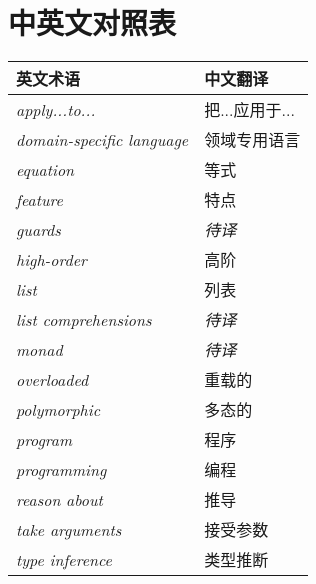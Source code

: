 \chapter*{中英文对照表}

\begin{table}[htbp]
\label{tab:threesome}
\centering
\begin{tabular}{ll}
\hline
英文术语 & 中文翻译 \\
\hline
\textit{apply...to...} & 把...应用于...\\
\textit{domain-specific language} & 领域专用语言 \\
\textit{equation} & 等式\\
\textit{feature} & 特点 \\
\textit{guards} & \textit{待译} \\
\textit{high-order} & 高阶 \\
\textit{list} & 列表 \\
\textit{list comprehensions} & \textit{待译}\\
\textit{monad} & \textit{待译} \\
\textit{overloaded} & 重载的 \\
\textit{polymorphic} & 多态的 \\
\textit{program} & 程序 \\
\textit{programming} & 编程\\
\textit{reason about} & 推导 \\
\textit{take arguments} & 接受参数 \\
\textit{type inference} & 类型推断 \\

\hline
\end{tabular}
\end{table}

